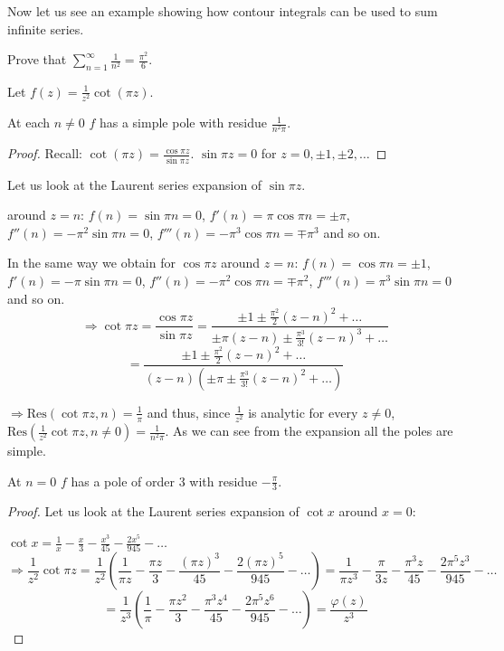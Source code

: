 Now let us see an example showing how contour integrals can be used to sum infinite series.
\begin{example}\label{example:24.3}
    Prove that $\sum_{n=1}^{\infty} \frac{1}{n^2} = \frac{\pi^2}{6}$.
\end{example}
\begin{soln}
 Let $f(z) = \frac{1}{z^2} \cot (\pi z)$.

\begin{claim}
     At each $n \neq 0$ $f$ has a simple pole with residue $\frac{1}{n^2 \pi}$.
\end{claim}
\begin{proof}
    
   Recall: $\cot (\pi z) = \frac{\cos \pi z}{\sin \pi z}$. $\sin \pi z = 0$ for $z = 0, \pm 1, \pm 2, \dots$
    
\end{proof}
Let us look at the Laurent series expansion of $\sin \pi z$.


around $z=n$: $f(n) = \sin \pi n = 0$, $f'(n) = \pi \cos \pi n = \pm \pi$, $f''(n) = -\pi^2 \sin \pi n = 0$, $f'''(n) = -\pi^3 \cos \pi n = \mp \pi^3$ and so on.

In the same way we obtain for $\cos \pi z$ around $z=n$:
$f(n) = \cos \pi n = \pm 1$, $f'(n) = -\pi \sin \pi n = 0$, $f''(n) = -\pi^2 \cos \pi n = \mp \pi^2$, $f'''(n) = \pi^3 \sin \pi n = 0$ and so on.
\[
\Rightarrow \cot \pi z = \frac{\cos \pi z}{\sin \pi z} = \frac{\pm 1 \pm \frac{\pi^2}{2} (z-n)^2 + \dots}{\pm \pi (z-n) \pm \frac{\pi^3}{3!} (z-n)^3 + \dots}
\]
\[
= \frac{\pm 1 \pm \frac{\pi^2}{2} (z-n)^2 + \dots}{(z-n) \left( \pm \pi \pm \frac{\pi^3}{3!} (z-n)^2 + \dots \right)}
\]

$\Rightarrow \text{Res} (\cot \pi z, n) = \frac{1}{\pi}$ and thus, since $\frac{1}{z^2}$ is analytic for every $z \neq 0$, $\text{Res} \left( \frac{1}{z^2} \cot \pi z, n \neq 0 \right) = \frac{1}{n^2 \pi}$. 
As we can see from the expansion all the poles are simple.

\begin{claim}[2]
    
    At $n=0$ $f$ has a pole of order 3 with residue $-\frac{\pi}{3}$.
\end{claim}
\begin{proof}
    
     Let us look at the Laurent series expansion of $\cot x$ around $x=0$:
    
    \checkthis{} $\cot x = \frac{1}{x} - \frac{x}{3} - \frac{x^3}{45} - \frac{2x^5}{945} - \dots$
    \[
        \Rightarrow \frac{1}{z^2} \cot \pi z = \frac{1}{z^2} \left( \frac{1}{\pi z} - \frac{\pi z}{3} - \frac{(\pi z)^3}{45} - \frac{2 (\pi z)^5}{945} - \dots \right) = \frac{1}{\pi z^3} - \frac{\pi}{3z} - \frac{\pi^3 z}{45} - \frac{2 \pi^5 z^3}{945} - \dots
        \]
        \[
            = \frac{1}{z^3} \left( \frac{1}{\pi} - \frac{\pi z^2}{3} - \frac{\pi^3 z^4}{45} - \frac{2 \pi^5 z^6}{945} - \dots \right) = \frac{\varphi(z)}{z^3}
            \]
            

\end{proof}
\end{soln}

